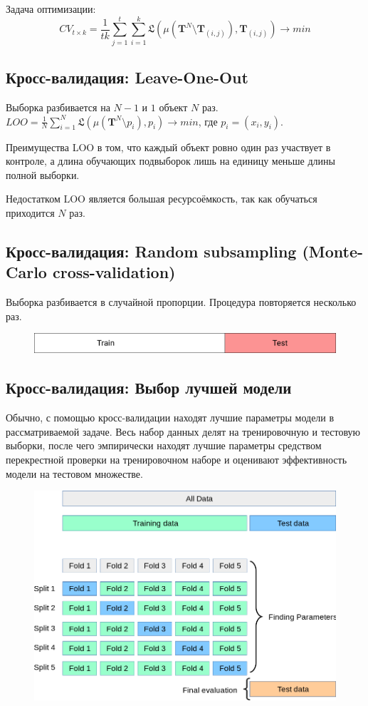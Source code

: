 \documentclass[11pt, oneside]{article}   	%
\begin{document}
Задача оптимизации: 
$$ CV_{t\times k} = \frac{1}{tk}\sum\limits_{j=1}^t\sum\limits_{i=1}^k\mathfrak{L}(\mu(\bm{T}^N \setminus \bm{T}_{(i,j)}), \bm{T}_{(i,j)}) \rightarrow min $$


\subsection{Кросс-валидация: Leave-One-Out}

Выборка разбивается на $ N-1 $ и $ 1 $ объект $ N $ раз.
$LOO = \frac{1}{N}\sum\limits_{i=1}^N\mathfrak{L}(\mu(\bm{T}^N \setminus p_i), p_i) \rightarrow min$, где $ p_i = (x_i, y_i) $.

Преимущества LOO в том, что каждый объект ровно один раз участвует в контроле, а длина обучающих подвыборок лишь на единицу меньше длины полной выборки.

Недостатком LOO является большая ресурсоёмкость, так как обучаться приходится $ N $ раз.

\subsection{Кросс-валидация: Random subsampling (Monte-Carlo cross-validation)}
Выборка разбивается в случайной пропорции. Процедура повторяется несколько раз.

\begin{figure}[h]
	\includegraphics[width=1\linewidth]{imgs/completecrossvalidation}
\end{figure}

\subsection{Кросс-валидация: Выбор лучшей модели}
Обычно, с помощью кросс-валидации находят лучшие параметры модели в рассматриваемой задаче. Весь набор данных делят на тренировочную и тестовую выборки, после чего эмпирически находят лучшие параметры средством перекрестной проверки на тренировочном наборе и оценивают эффективность модели на тестовом множестве.

\begin{figure}[h]
	\includegraphics[width=1\linewidth]{imgs/model_selection}
\end{figure}
\end{document}
